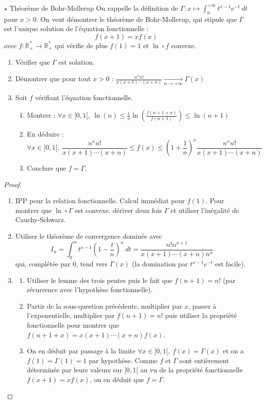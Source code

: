 \documentclass[french,a4paper]{article}
\newcommand{\R}{\mathbb{R}}
\newcommand{\st}{^*}
\theoremstyle{plain}
\theoremstyle{definition}
\theoremstyle{remark}
\begin{document}
\begin{ex}[Châteaux]{$\star$ Théorème de Bohr-Mollerup}
	On rappelle la définition de $\Gamma:x\mapsto\displaystyle\int_{0}^{+\infty}t^{x-1}e^{-t}\ dt$ pour $x>0$. On veut démontrer le théorème de Bohr-Mollerup, qui stipule que $\Gamma$ est l'unique solution de l'équation fonctionnelle : $$f(x+1)=xf(x)$$ avec $f:\R_+\st\to\R_+\st$ qui vérifie de plus $f(1)=1$ et $\ln\circ f$ convexe.
	\begin{enumerate}
		\item Vérifier que $\Gamma$ est solution.
		\item Démontrer que pour tout $x>0$ : $\displaystyle\frac{n^xn!}{x(x+1)\cdots(x+n)}\xrightarrow[n\to+\infty]{}\Gamma(x)$
		\item Soit $f$ vérifiant l'équation fonctionnelle.
		\begin{enumerate}[label=\alph*.]
			\item Montrer : $\displaystyle\forall x\in]0,1[,\ \ln(n)\leqslant\frac{1}{x}\ln\left(\frac{f(n+1+x)}{f(n+1)}\right)\leqslant\ln(n+1)$
			\item En déduire : $$\forall x\in]0,1[,\ \displaystyle\frac{n^xn!}{x(x+1)\cdots(x+n)}\leqslant f(x)\leqslant\left(1+\frac{1}{n}\right)^x\frac{n^xn!}{x(x+1)\cdots(x+n)}$$
			\item Conclure que $f=\Gamma$.
		\end{enumerate}
	\end{enumerate}
\end{ex}
\begin{proof}
	\begin{enumerate}
		\item IPP pour la relation fonctionnelle. Calcul immédiat pour $f(1)$. Pour montrer que $\ln\circ\Gamma$ est convexe, dériver deux fois $\Gamma$ et utiliser l'inégalité de Cauchy-Schwarz.
		\item Utiliser le théorème de convergence dominée avec $$I_n=\int_{0}^{n}t^{x-1}\left(1-\frac{t}{n}\right)^{n}\ dt=\frac{n!n^{x+1}}{x(x+1)\cdots(x+n)n^x}$$ qui, complétée par $0$, tend vers $\Gamma(x)$ (la domination par $t^{x-1}e^{-t}$ est facile). 
		\item \begin{enumerate}[label=\alph*.]
			\item Utiliser le lemme des trois pentes puis le fait que $f(n+1)=n!$ (par récurrence avec l'hypothèse fonctionnelle).
			\item Partir de la sous-question précédente, multiplier par $x$, passer à l'exponentielle, multiplier par $f(n+1)=n!$ puis utiliser la propriété fonctionnelle pour montrer que $f(n+1+x)=x(x+1)\cdots(x+n)f(x)$.
			\item On en déduit par passage à la limite $\forall x\in]0,1[,\ f(x)=\Gamma(x)$ et on a $f(1)=\Gamma(1)=1$ par hypothèse. Comme $f$ et $\Gamma$ sont entièrement déterminée par leurs valeurs sur $]0,1[$ au vu de la propriété fonctionnelle $f(x+1)=xf(x)$, on en déduit que $f=\Gamma$.
		\end{enumerate}
	\end{enumerate}
\end{proof}
\end{document}
